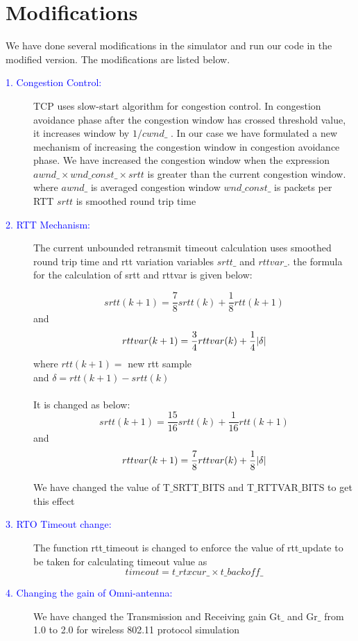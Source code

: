 \documentclass{article}[12pt]
\begin{document}
\section{Modifications}
\label{sec:mod}
    We have done several modifications in the simulator and run our code in the modified version. The modifications are listed below.

    \begin{description}
        \item[\textcolor{blue}{1. Congestion Control:}]
    TCP uses slow-start algorithm for congestion control. In congestion avoidance phase after the congestion window has crossed threshold value, it increases window by $1/{cwnd\_}$ . In our case we have formulated a new mechanism of increasing the congestion window in congestion avoidance phase. We have increased the congestion window when the expression ${awnd\_ \times wnd\_const\_ \times srtt}$ is greater than the current congestion window.
    where $awnd\_$ is averaged congestion window
    $wnd\_const\_$ is packets per RTT
    $srtt$ is smoothed round trip time
    
    \item[\textcolor{blue}{2. RTT Mechanism:}]
    The current unbounded retransmit timeout calculation uses smoothed round trip time and rtt variation variables $srtt\_$ and $rttvar\_$. the formula for the calculation of srtt and rttvar is given below:
    
    $$srtt(k+1) = \frac{7}{8} srtt(k) + \frac{1}{8} rtt(k+1)$$
    and $$rttvar(k+1) = \frac{3}{4} rttvar(k) + \frac{1}{4} \abs{\delta} $$ 
    where $rtt(k+1) = $ new rtt sample
    \\
    and $\delta = rtt(k+1) - srtt(k)$
    \\
    \\
    It is changed as below:
    $$srtt(k+1) = \frac{15}{16} srtt(k) + \frac{1}{16} rtt(k+1)$$
    and $$rttvar(k+1) = \frac{7}{8} rttvar(k) + \frac{1}{8} \abs{\delta} $$ 
    
    We have changed the value of T$\_$SRTT$\_$BITS and T$\_$RTTVAR$\_$BITS to get this effect
    
    \item[\textcolor{blue}{3. RTO Timeout change:}]
    The function rtt$\_$timeout is changed to enforce the value of rtt$\_$update to be taken for calculating timeout value as
    $$timeout = t\_rtxcur\_ \times t\_backoff\_$$
    
    
    \item[\textcolor{blue}{4. Changing the gain of Omni-antenna:}]
    We have changed the Transmission and Receiving gain Gt$\_$ and Gr$\_$ from 1.0 to 2.0 for wireless 802.11 protocol simulation
    

\end{description}
\end{document}

